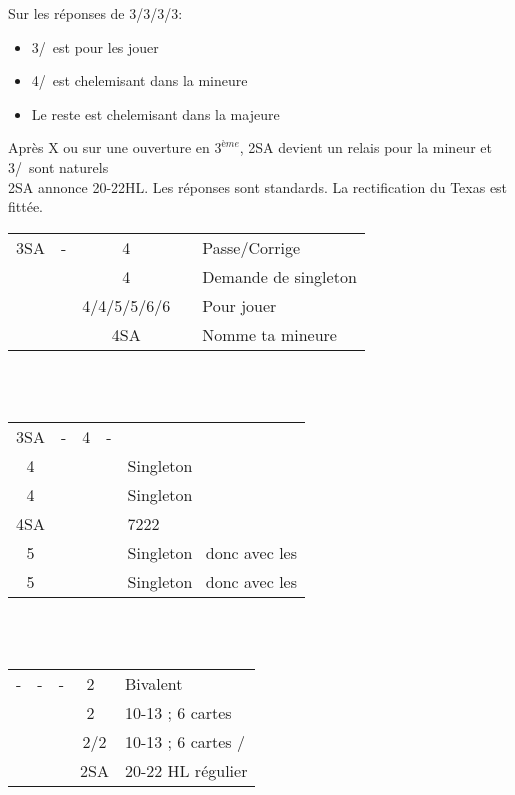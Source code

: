 \documentclass[a4paper, oneside, 11pt]{report}
\begin{document}
	Sur les réponses de 3\trefle/3\carreau/3\coeur/3\pique:
	\begin{itemize}
	\item 3\coeur/\pique\ est pour les jouer
	\item 4\trefle/\carreau\ est chelemisant dans la mineure
	\item Le reste est chelemisant dans la majeure\\
	\end{itemize}
	
	Après X ou sur une ouverture en $3^{ème}$, 2SA devient un relais pour la mineur et 3\trefle/\carreau\ sont naturels\\

	2SA annonce 20-22HL. Les réponses sont standards. La rectification du Texas est fittée.\\

	\begin{tabular}{cccc|l}
	3SA & - & 4\trefle && Passe/Corrige\\
	&& 4\carreau && Demande de singleton\\
	&& 4\coeur/4\pique/5\trefle/5\carreau/6\trefle/6\carreau && Pour jouer\\
	&& 4SA && Nomme ta mineure\\
	\end{tabular}\\\\
	
	\begin{tabular}{cccc|l}
	3SA & - & 4\carreau & - &\\
	4\coeur &&&& Singleton \coeur\\
	4\pique &&&& Singleton \pique\\
	4SA &&&& 7222\\
	5\trefle &&&& Singleton \carreau\ donc avec les \trefle\\
	5\carreau &&&& Singleton \trefle\ donc avec les \carreau\\
	\end{tabular}\\\\

	\begin{tabular}{cccc|l}
	- & - & - & 2\trefle\ & Bivalent\\
	&&& 2\carreau\ & 10-13 ; 6 cartes \carreau\\
	&&& 2\coeur/2\pique & 10-13 ; 6 cartes \coeur/\pique\\
	&&& 2SA & 20-22 HL régulier\\
	\end{tabular}\\\\
	
\end{document}
